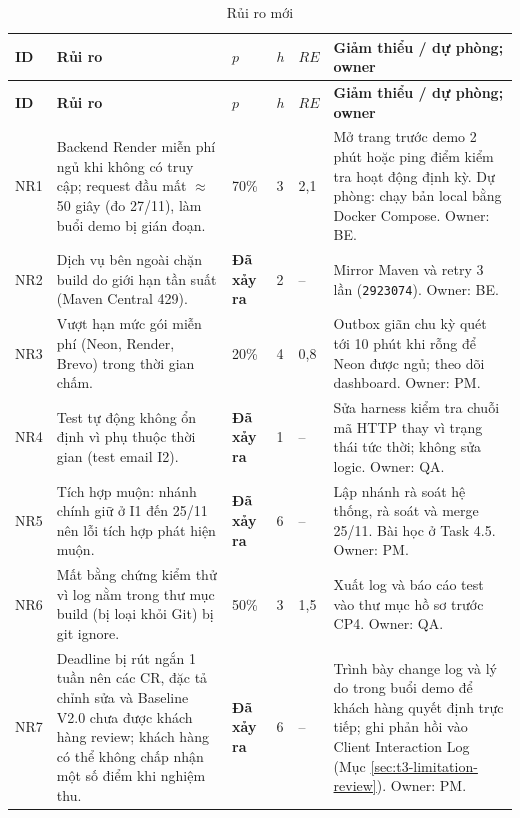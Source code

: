 \begingroup\footnotesize
\renewcommand{\arraystretch}{1.15}
\begin{longtable}{@{}p{.05\linewidth}p{.30\linewidth}p{.05\linewidth}p{.04\linewidth}p{.05\linewidth}p{.36\linewidth}@{}}
\caption{Rủi ro mới}\label{tab:t3-risk-new}\\
\toprule
\textbf{ID} & \textbf{Rủi ro} & \textbf{$p$} & \textbf{$h$} & \textbf{$RE$} & \textbf{Giảm thiểu / dự phòng; owner}\\\midrule\endfirsthead
\toprule
\textbf{ID} & \textbf{Rủi ro} & \textbf{$p$} & \textbf{$h$} & \textbf{$RE$} & \textbf{Giảm thiểu / dự phòng; owner}\\\midrule\endhead
\bottomrule\endfoot
NR1 & Backend Render miễn phí ngủ khi không có truy cập; request đầu mất $\approx$ 50 giây (đo 27/11), làm buổi demo bị gián đoạn. & 70\% & 3 & 2,1 & Mở trang trước demo 2 phút hoặc ping điểm kiểm tra hoạt động định kỳ. Dự phòng: chạy bản local bằng Docker Compose. Owner: BE.\\
NR2 & Dịch vụ bên ngoài chặn build do giới hạn tần suất (Maven Central 429). & \textbf{Đã xảy ra} & 2 & -- & Mirror Maven và retry 3 lần (\texttt{2923074}). Owner: BE.\\
NR3 & Vượt hạn mức gói miễn phí (Neon, Render, Brevo) trong thời gian chấm. & 20\% & 4 & 0,8 & Outbox giãn chu kỳ quét tới 10 phút khi rỗng để Neon được ngủ; theo dõi dashboard. Owner: PM.\\
NR4 & Test tự động không ổn định vì phụ thuộc thời gian (test email I2). & \textbf{Đã xảy ra} & 1 & -- & Sửa harness kiểm tra chuỗi mã HTTP thay vì trạng thái tức thời; không sửa logic. Owner: QA.\\
NR5 & Tích hợp muộn: nhánh chính giữ ở I1 đến 25/11 nên lỗi tích hợp phát hiện muộn. & \textbf{Đã xảy ra} & 6 & -- & Lập nhánh rà soát hệ thống, rà soát và merge 25/11. Bài học ở Task 4.5. Owner: PM.\\
NR6 & Mất bằng chứng kiểm thử vì log nằm trong thư mục build (bị loại khỏi Git) bị git ignore. & 50\% & 3 & 1,5 & Xuất log và báo cáo test vào thư mục hồ sơ trước CP4. Owner: QA.\\
NR7 & Deadline bị rút ngắn 1 tuần nên các CR, đặc tả chỉnh sửa và Baseline V2.0 chưa được khách hàng review; khách hàng có thể không chấp nhận một số điểm khi nghiệm thu. & \textbf{Đã xảy ra} & 6 & -- & Trình bày change log và lý do trong buổi demo để khách hàng quyết định trực tiếp; ghi phản hồi vào Client Interaction Log (Mục \ref{sec:t3-limitation-review}). Owner: PM.\\
\end{longtable}
\endgroup

